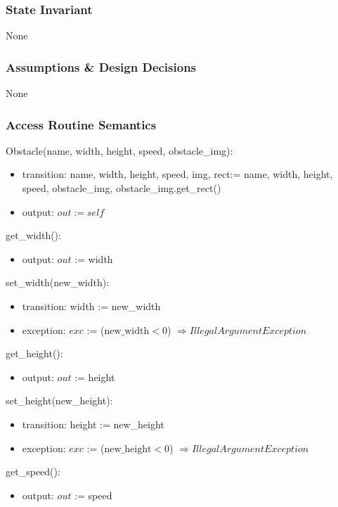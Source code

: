 \documentclass[12pt]{article}
\begin{document}
\subsubsection* {State Invariant}

None

\subsubsection* {Assumptions \& Design Decisions}

None

\subsubsection* {Access Routine Semantics}

\noindent Obstacle(name, width, height, speed, obstacle\_img):
\begin{itemize}
    \item transition:  name, width, height, speed, img, rect:= name, width, height, speed, obstacle\_img, obstacle\_img.get\_rect()
    \item output: $out := self$
\end{itemize}

\noindent get\_width():
\begin{itemize}
    \item output: $out$ := width 
\end{itemize}


\noindent set\_width(new\_width):
\begin{itemize}
    \item transition: width := new\_width 
    \item exception: $exc$ := ($\text{new\_width} < 0$) $\Rightarrow  IllegalArgumentException$
\end{itemize}

\noindent get\_height():
\begin{itemize}
    \item output: $out$ := height
\end{itemize}


\noindent set\_height(new\_height):
\begin{itemize}
    \item transition: height := new\_height
    \item exception: $exc$ := ($\text{new\_height} < 0$) $\Rightarrow  IllegalArgumentException$
\end{itemize}


\noindent get\_speed():
\begin{itemize}
    \item output: $out$ := speed
\end{itemize}
\end{document}
